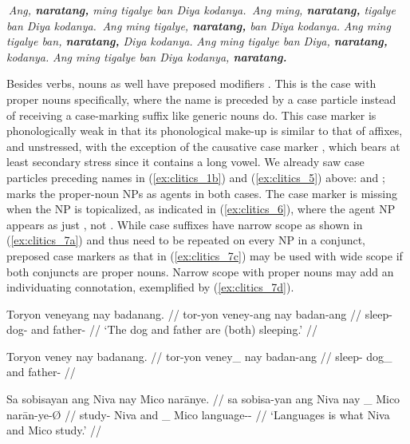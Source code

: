 \a \ljudge{*} \textit{Ang, \textbf{naratang,} ming tigalye ban Diya kodanya.}
\a \ljudge{*} \textit{Ang ming, \textbf{naratang,} tigalye ban Diya kodanya.}
\a \ljudge{\ques} \textit{Ang ming tigalye, \textbf{naratang,} ban Diya
	kodanya.}
\a \textit{Ang ming tigalye ban, \textbf{naratang,} Diya kodanya.}
\a \textit{Ang ming tigalye ban Diya, \textbf{naratang,} kodanya.}
\a \textit{Ang ming tigalye ban Diya kodanya, \textbf{naratang.}}

\xe

\label{clitics_prenoun_case}
Besides verbs, nouns as well have preposed modifiers . This is the
case with proper nouns specifically, where the name is preceded by a case
particle instead of receiving a case-marking suffix like generic nouns do. This
case marker is phonologically weak in that its phonological make-up is similar
to that of affixes, and unstressed, with the exception of the causative case
marker , which bears at least secondary stress since it contains
a long vowel. We already saw case particles preceding names in
(\ref{ex:clitics_1b}) and (\ref{ex:clitics_5}) above:  and ;   marks the proper-noun NPs
as agents in both cases. The case marker is missing when the NP is topicalized,
as indicated in (\ref{ex:clitics_6}), where the agent NP appears as just
, not . While case suffixes have narrow
scope as shown in (\ref{ex:clitics_7a}) and thus need to be repeated on every
NP in a conjunct, preposed case markers as that in (\ref{ex:clitics_7c}) may be
used with wide scope if both conjuncts are proper nouns. Narrow scope with
proper nouns may add an individuating connotation, exemplified by
(\ref{ex:clitics_7d}).

\pex\label{ex:clitics_7}
\a\label{ex:clitics_7a}\begingl
	\gla Toryon veneyang nay badanang. //
	\glb tor-yon veney-ang nay badan-ang //
	\glc sleep-\TplN{} dog-\Aarg{} and father-\Aarg{} //
	\glft `The dog and father are (both) sleeping.' //
\endgl

\a\label{ex:clitics_7b}\ljudge{*}\begingl
	\gla Toryon veney nay badanang. //
	\glb tor-yon veney\_ nay badan-ang //
	\glc sleep-\TplN{} dog\_ and father-\Aarg{} //
\endgl

\a\label{ex:clitics_7c}\begingl
	\gla Sa sobisayan ang Niva nay {} Mico narānye. //
	\glb sa sobisa-yan ang Niva nay \_ Mico narān-ye-Ø //
	\glc \PatT{} study-\TplM{} \Aarg{} Niva and \_ Mico 
		language-\Pl{}-\Top{} //
	\glft `Languages is what Niva and Mico study.' //
\endgl

